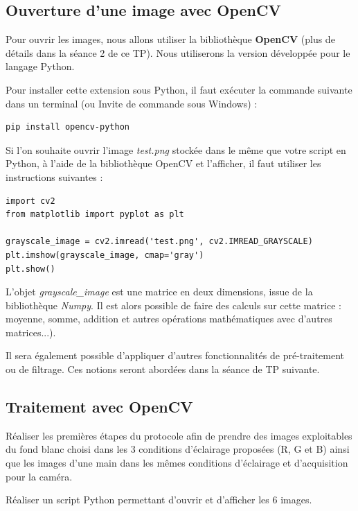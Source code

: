 \documentclass[a4paper,11pt,titlepage]{article} %
\begin{document}
\newpage
\subsection{Ouverture d'une image avec OpenCV}

Pour ouvrir les images, nous allons utiliser la bibliothèque \textbf{OpenCV} (plus de détails dans la séance 2 de ce TP). Nous utiliserons la version développée pour le langage Python.

Pour installer cette extension sous Python, il faut exécuter la commande suivante dans un terminal (ou Invite de commande sous Windows) :

\begin{lstlisting}
pip install opencv-python
\end{lstlisting}

\medskip

Si l'on souhaite ouvrir l'image \textsl{test.png} stockée dans le même que votre script en Python, à l'aide de la bibliothèque OpenCV et l'afficher, il faut utiliser les instructions suivantes :

\begin{lstlisting}
import cv2
from matplotlib import pyplot as plt

grayscale_image = cv2.imread('test.png', cv2.IMREAD_GRAYSCALE)
plt.imshow(grayscale_image, cmap='gray')
plt.show()
\end{lstlisting}

L'objet \textsl{grayscale\_image} est une matrice en deux dimensions, issue de la bibliothèque \textsl{Numpy}. Il est alors possible de faire des calculs sur cette matrice : moyenne, somme, addition et autres opérations mathématiques avec d'autres matrices...).

Il sera également possible d'appliquer d'autres fonctionnalités de pré-traitement ou de filtrage. Ces notions seront abordées dans la séance de TP suivante.


\subsection{Traitement avec OpenCV}

\Manip Réaliser les premières étapes du protocole afin de prendre des images exploitables du fond blanc choisi dans les 3 conditions d'éclairage proposées (R, G et B) ainsi que les images d'une main dans les mêmes conditions d'éclairage et d'acquisition pour la caméra.

\Manip Réaliser un script Python permettant d'ouvrir et d'afficher les 6 images.
\end{document}
